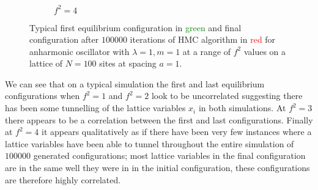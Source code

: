 \documentclass[12pt]{article}
\begin{document}
\begin{figure}
\begin{subfigure}[b]{0.5\textwidth}
                        \caption{$f^2=4$}
                        \label{fig:initialfinalf4}
                        \vspace{4ex}
                    \end{subfigure}
                    \caption{Typical first equilibrium configuration in \textcolor{green}{green} and final configuration after $100000$ iterations of HMC algorithm in \textcolor{red}{red} for anharmonic oscillator with $\lambda=1, m=1$ at a range of $f^2$ values on a lattice of $N=100$ sites at spacing $a = 1$.}
                    \label{fig:IntialFinalConfigurations}
                \end{figure} 


        

                

        We can see that on a typical simulation the first and last equilibrium configurations when $f^2=1$ and $f^2=2$ look to be uncorrelated suggesting there has been some tunnelling of the lattice variables $x_i$ in both simulations. At $f^2=3$ there appears to be a correlation between the first and last configurations. Finally at $f^2=4$ it appears qualitatively as if there have been very few instances where a lattice variables have been able to tunnel throughout the entire simulation of $100000$ generated configurations; most lattice variables in the final configuration are in the same well they were in in the initial configuration, these configurations are therefore highly correlated.
\end{document}
